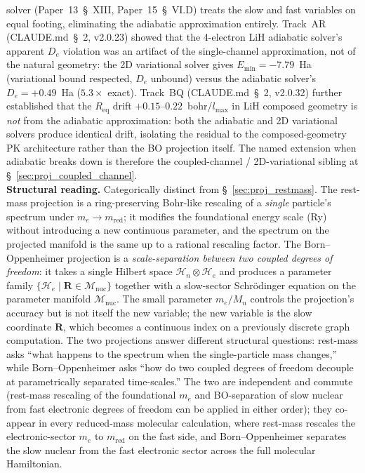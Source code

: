 solver (Paper~13~\S~XIII, Paper~15~\S~VI.D) treats the slow and fast
variables on equal footing, eliminating the adiabatic approximation
entirely.  Track~AR (CLAUDE.md~\S~2, v2.0.23) showed that the 4-electron
LiH adiabatic solver's apparent $D_e$ violation was an artifact of
the single-channel approximation, not of the natural geometry: the 2D
variational solver gives $E_\text{min} = -7.79$~Ha (variational bound
respected, $D_e$ unbound) versus the adiabatic solver's $D_e = +0.49$~Ha
($5.3\times$ exact).  Track~BQ (CLAUDE.md~\S~2, v2.0.32) further
established that the $R_\text{eq}$ drift $+0.15$--$0.22$~bohr/$l_\text{max}$
in LiH composed geometry is \emph{not} from the adiabatic
approximation: both the adiabatic and 2D variational solvers produce
identical drift, isolating the residual to the composed-geometry PK
architecture rather than the BO projection itself.  The named extension
when adiabatic breaks down is therefore the coupled-channel /
2D-variational sibling at \S~\ref{sec:proj_coupled_channel}.\\
\textbf{Structural reading.}  Categorically distinct from
\S~\ref{sec:proj_restmass}.  The rest-mass projection is a
ring-preserving Bohr-like rescaling of a \emph{single} particle's
spectrum under $m_e \to m_\text{red}$; it modifies the foundational
energy scale (Ry) without introducing a new continuous parameter,
and the spectrum on the projected manifold is the same up to a
rational rescaling factor.  The Born--Oppenheimer projection is a
\emph{scale-separation between two coupled degrees of freedom}: it
takes a single Hilbert space $\mathcal{H}_n \otimes \mathcal{H}_e$ and
produces a parameter family $\{ \mathcal{H}_e \mid \bm{R} \in
\mathcal{M}_\text{nuc} \}$ together with a slow-sector Schr\"odinger
equation on the parameter manifold $\mathcal{M}_\text{nuc}$.  The
small parameter $m_e / M_n$ controls the projection's accuracy but is
not itself the new variable; the new variable is the slow coordinate
$\bm{R}$, which becomes a continuous index on a previously discrete
graph computation.  The two projections answer different structural
questions: rest-mass asks ``what happens to the spectrum when the
single-particle mass changes,'' while Born--Oppenheimer asks ``how
do two coupled degrees of freedom decouple at parametrically separated
time-scales.''
The two are independent and commute (rest-mass rescaling of the
foundational $m_e$ and BO-separation of slow nuclear from fast
electronic degrees of freedom can be applied in either order); they
co-appear in every reduced-mass molecular calculation, where
rest-mass rescales the electronic-sector $m_e$ to $m_\text{red}$ on
the fast side, and Born--Oppenheimer separates the slow nuclear from
the fast electronic sector across the full molecular Hamiltonian.

